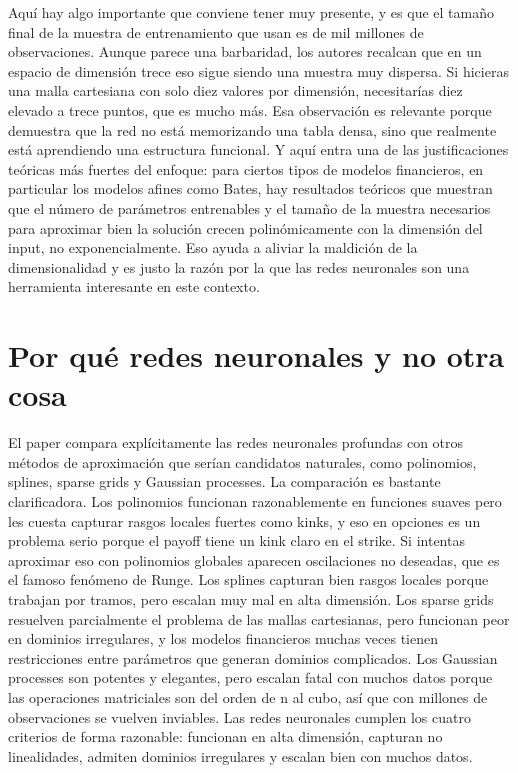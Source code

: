\documentclass[11pt,a4paper]{article}
\begin{document}
Aquí hay algo importante que conviene tener muy presente, y es que el tamaño final de la muestra de entrenamiento que usan es de mil millones de observaciones. Aunque parece una barbaridad, los autores recalcan que en un espacio de dimensión trece eso sigue siendo una muestra muy dispersa. Si hicieras una malla cartesiana con solo diez valores por dimensión, necesitarías diez elevado a trece puntos, que es mucho más. Esa observación es relevante porque demuestra que la red no está memorizando una tabla densa, sino que realmente está aprendiendo una estructura funcional. Y aquí entra una de las justificaciones teóricas más fuertes del enfoque: para ciertos tipos de modelos financieros, en particular los modelos afines como Bates, hay resultados teóricos que muestran que el número de parámetros entrenables y el tamaño de la muestra necesarios para aproximar bien la solución crecen polinómicamente con la dimensión del input, no exponencialmente. Eso ayuda a aliviar la maldición de la dimensionalidad y es justo la razón por la que las redes neuronales son una herramienta interesante en este contexto.

\section*{Por qué redes neuronales y no otra cosa}

El paper compara explícitamente las redes neuronales profundas con otros métodos de aproximación que serían candidatos naturales, como polinomios, splines, sparse grids y Gaussian processes. La comparación es bastante clarificadora. Los polinomios funcionan razonablemente en funciones suaves pero les cuesta capturar rasgos locales fuertes como kinks, y eso en opciones es un problema serio porque el payoff tiene un kink claro en el strike. Si intentas aproximar eso con polinomios globales aparecen oscilaciones no deseadas, que es el famoso fenómeno de Runge. Los splines capturan bien rasgos locales porque trabajan por tramos, pero escalan muy mal en alta dimensión. Los sparse grids resuelven parcialmente el problema de las mallas cartesianas, pero funcionan peor en dominios irregulares, y los modelos financieros muchas veces tienen restricciones entre parámetros que generan dominios complicados. Los Gaussian processes son potentes y elegantes, pero escalan fatal con muchos datos porque las operaciones matriciales son del orden de n al cubo, así que con millones de observaciones se vuelven inviables. Las redes neuronales cumplen los cuatro criterios de forma razonable: funcionan en alta dimensión, capturan no linealidades, admiten dominios irregulares y escalan bien con muchos datos.
\end{document}
